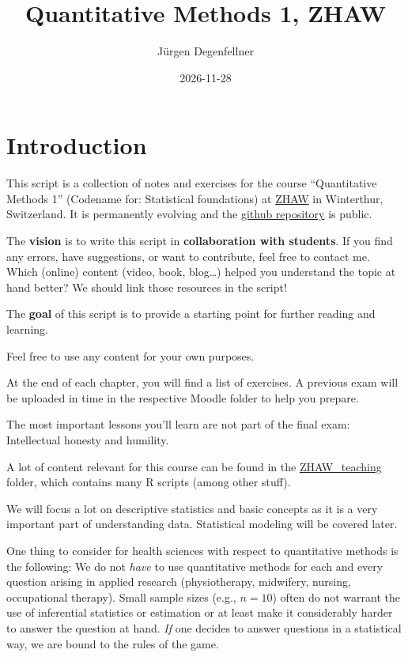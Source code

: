 \documentclass[
]{book}
\title{Quantitative Methods 1, ZHAW}
\author{Jürgen Degenfellner}
\date{2026-11-28}
\begin{document}
\maketitle

{
\setcounter{tocdepth}{1}
\tableofcontents
}
\chapter*{Introduction}\label{introduction}

This script is a collection of notes and exercises for the course ``Quantitative Methods 1'' (Codename for: Statistical foundations) at \href{https://www.zhaw.ch/en/university/}{ZHAW} in Winterthur, Switzerland.
It is permanently evolving and the \href{https://github.com/jdegenfellner/Script_QM1_ZHAW}{github repository} is public.

The \textbf{vision} is to write this script in \textbf{collaboration with students}. If you find any errors, have suggestions, or want to contribute, feel free to contact me.
Which (online) content (video, book, blog\ldots) helped you understand the topic at hand better? We should link those resources in the script!

The \textbf{goal} of this script is to provide a starting point for further reading and learning.

Feel free to use any content for your own purposes.

At the end of each chapter, you will find a list of exercises.
A previous exam will be uploaded in time in
the respective Moodle folder to help you prepare.

The most important lessons you'll learn are not part of the final exam: Intellectual honesty and humility.

A lot of content relevant for this course can be found in the \href{https://github.com/jdegenfellner/ZHAW_Teaching}{ZHAW\_teaching} folder,
which contains many R scripts (among other stuff).

We will focus a lot on descriptive statistics and basic concepts as it is a very important part of understanding data.
Statistical modeling will be covered later.

One thing to consider for health sciences with respect to quantitative methods is the following: We do not \emph{have} to use quantitative methods for each and every
question arising in applied research (physiotherapy, midwifery, nursing, occupational therapy). Small sample sizes (e.g., \(n=10\)) often do not warrant the use of inferential
statistics or estimation or at least make it considerably harder to answer the question at hand.
\emph{If} one decides to answer questions in a statistical way, we are bound to the rules of the game.
\end{document}
